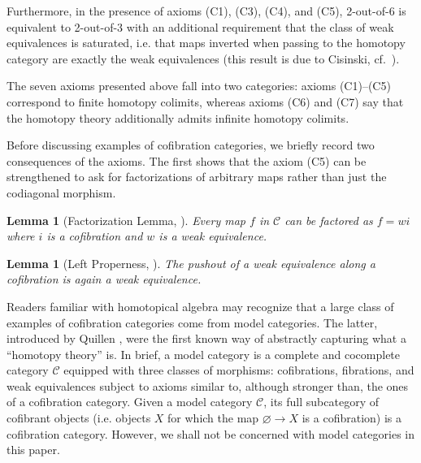 \documentclass[11pt]{article}
\newtheorem{lemma}[theo]{Lemma}
\theoremstyle{definition}
\numberwithin{equation}{section}
\newcommand{\C}{\mathcal{C}}
\begin{document}
Furthermore, in the presence of axioms (C1), (C3), (C4), and (C5), 2-out-of-6 is equivalent to 2-out-of-3 with an additional requirement that the class of weak equivalences is saturated, i.e. that maps inverted when passing to the homotopy category are exactly the weak equivalences (this result is due to Cisinski, cf.~\cite[Thm.~7.2.7]{radulescu-banu}).

The seven axioms presented above fall into two categories: axioms (C1)--(C5) correspond to finite homotopy colimits, whereas axioms (C6) and (C7) say that the homotopy theory additionally admits infinite homotopy colimits.

Before discussing examples of cofibration categories, we briefly record two consequences of the axioms.
The first shows that the axiom (C5) can be strengthened to ask for factorizations of arbitrary maps rather than just the codiagonal morphism.

\begin{lemma}[Factorization Lemma, {\cite[p.~421]{brown:abstract-homotopy-theory}}]
  Every map $f$ in $\C$ can be factored as $f = w i$ where $i$ is a cofibration and $w$ is a weak equivalence.
\end{lemma}

\begin{lemma}[Left Properness, {\cite[Lem.~I.4.2]{brown:abstract-homotopy-theory}}] \label{left-properness}
  The pushout of a weak equivalence along a cofibration is again a weak equivalence.
\end{lemma}

Readers familiar with homotopical algebra may recognize that a large class of examples of cofibration categories come from model categories.
The latter, introduced by Quillen \cite{quillen:book}, were the first known way of abstractly capturing what a ``homotopy theory'' is.
In brief, a model category is a complete and cocomplete category $\C$ equipped with three classes of morphisms: cofibrations, fibrations, and weak equivalences subject to axioms similar to, although stronger than, the ones of a cofibration category.
Given a model category $\C$, its full subcategory of cofibrant objects (i.e. objects $X$ for which the map $\varnothing \to X$ is a cofibration) is a cofibration category.
However, we shall not be concerned with model categories in this paper.
\end{document}
